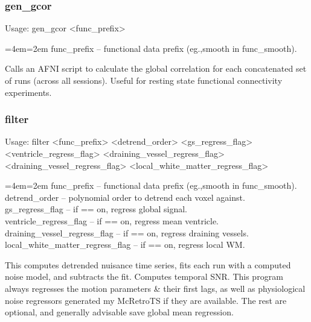 \documentclass[final,titlepage,letterpaper,oneside,12pt]{article}
\renewcommand{\texttt}[2][BrickRed]{\textcolor{#1}{\ttfamily #2}}%
\newenvironment{blockquote}{%
  \par%
  \medskip
  \leftskip=4em\rightskip=2em%
  \noindent\ignorespaces}{%
  \par\medskip}
\begin{document}
\subsubsection{gen\_gcor}
Usage: \texttt{gen\_gcor <func\_prefix>}

\begin{blockquote}
func\_prefix -- functional data prefix (eg.,smooth in func\_smooth).
\end{blockquote}

\noindent Calls an AFNI script to calculate the global correlation for each concatenated set of runs (across all sessions). Useful for resting state functional connectivity experiments.

\subsubsection{filter}
Usage: \texttt{filter <func\_prefix> <detrend\_order> <gs\_regress\_flag> \\
<ventricle\_regress\_flag> <draining\_vessel\_regress\_flag> \\
<draining\_vessel\_regress\_flag> <local\_white\_matter\_regress\_flag>}

\begin{blockquote}
func\_prefix -- functional data prefix (eg.,smooth in func\_smooth). \\
detrend\_order -- polynomial order to detrend each voxel against. \\
gs\_regress\_flag -- if == on, regress global signal. \\
ventricle\_regress\_flag -- if == on, regress mean ventricle. \\
draining\_vessel\_regress\_flag -- if == on, regress draining vessels. \\
local\_white\_matter\_regress\_flag -- if == on, regress local WM. \

\end{blockquote}

\noindent This computes detrended nuisance time series, fits each run with a computed noise model, and subtracts the fit. Computes temporal SNR. This program always regresses the motion parameters \& their first lags, as well as physiological noise regressors generated my McRetroTS if they are available. The rest are optional, and generally advisable save global mean regression.
\end{document}
